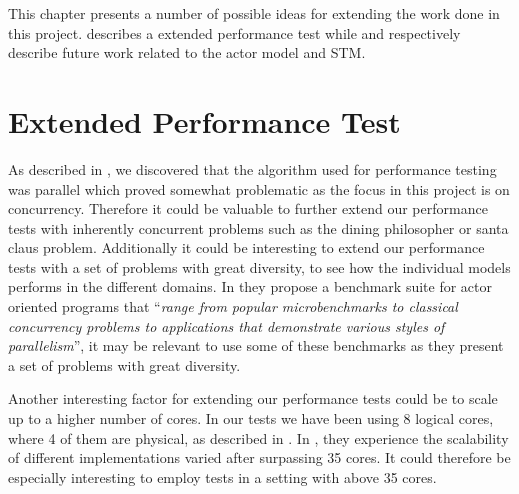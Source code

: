 \makeatletter {}\makeatother
{}
This chapter presents a number of possible ideas for extending the work done in this project.  describes a extended performance test while  and  respectively describe future work related to the actor model and \ac{STM}.
\section{Extended Performance Test}
\label{sec:extended_performance_test}
As described in , we discovered that the algorithm used for performance testing was parallel which proved somewhat problematic as the focus in this project is on concurrency. Therefore it could be valuable to further extend our performance tests with inherently concurrent problems such as the dining philosopher or santa claus problem. Additionally it could be interesting to extend our performance tests with a set of problems with great diversity, to see how the individual models performs in the different domains. In \cite{imam2014savina} they propose a benchmark suite for actor oriented programs that ``\textit{range from popular microbenchmarks to classical concurrency problems to applications that demonstrate various styles of parallelism}'', it may be relevant to use some of these benchmarks as they present a set of problems with great diversity.

Another interesting factor for extending our performance tests could be to scale up to a higher number of cores. In our tests we have been using 8 logical cores, where 4 of them are physical, as described in . In \cite{harris2003language}, they experience the scalability of different implementations varied after surpassing 35 cores. It could therefore be especially interesting to employ tests in a setting with above 35 cores.


